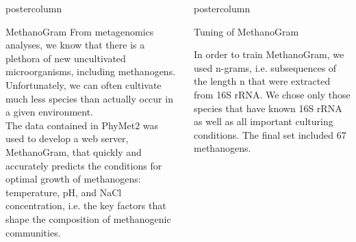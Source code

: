 \documentclass[final]{beamer}\usepackage[]{graphicx}\usepackage[]{color}
\newlength{\columnheight}
\begin{document}
\begin{frame}
\begin{columns}
\begin{column}{.53\textwidth}
\begin{beamercolorbox}[center,wd=\textwidth]{postercolumn}
\begin{minipage}[T]{.95\textwidth}
{\begin{block}{MethanoGram}
From metagenomics analyses, we know that there is a plethora of new uncultivated microorganisms, including methanogens. Unfortunately, we can often cultivate much less species than actually occur in a given environment.\\ The data contained in PhyMet2 was used to develop a web server, MethanoGram, that quickly and accurately predicts the conditions for optimal growth of methanogens: temperature, pH, and NaCl concentration, i.e. the key factors that shape the composition of methanogenic communities.


\end{block}


}
\end{minipage}
\end{beamercolorbox}
\end{column}



\begin{column}{.48\textwidth}
\begin{beamercolorbox}[center,wd=\textwidth]{postercolumn}
\begin{minipage}[T]{.95\textwidth}  
\parbox[t][\columnheight]{\textwidth}
{








\begin{block}{Tuning of MethanoGram}

In order to train MethanoGram, we used n-grams, i.e. subsequences of the length n that were extracted from 16S rRNA. We chose only those species that have known 16S rRNA as well as all important culturing conditions. The final set included 67 methanogens.


\end{block}}
\end{minipage}
\end{beamercolorbox}
\end{column}
\end{columns}
\end{frame}
\end{document}
